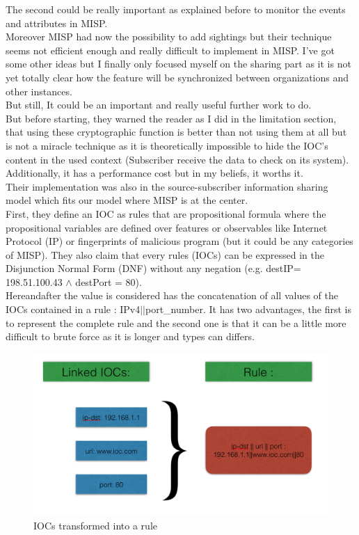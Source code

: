 \documentclass{eplmastersthesis}
\begin{document}
The second could be really important as explained before to monitor the events and attributes in MISP.\\ 
Moreover MISP had now the possibility to add sightings but their technique seems not efficient enough and really difficult to implement in MISP. I've got some other ideas but I finally only focused myself on the sharing part as it is not yet totally clear how the feature will be synchronized between organizations and other instances.\\ 
But still, It could be an important and really useful further work to do.\\

But before starting, they warned the reader as I did in the limitation section, that using these cryptographic function is better than not using them at all but is not a miracle technique as it is theoretically impossible to hide the IOC’s content in the used context (Subscriber receive the data to check on its system).\\
Additionally, it has a performance cost but in my beliefs, it worths it.\\ Their implementation was also in the source-subscriber information sharing model which fits our model where MISP is at the center.\\
First, they define an IOC as rules that are propositional formula where the propositional variables are defined over features or observables like Internet Protocol (IP) or fingerprints of malicious program (but it could be any categories of MISP). They also claim that every rules (IOCs) can be expressed in the Disjunction Normal Form (DNF) without any negation (e.g. destIP= 198.51.100.43 $\land$ destPort = 80).\\
Hereandafter the value is considered has the concatenation of all values of the IOCs contained in a rule : IPv4$||$port\_number. It has two advantages, the first is to represent the complete rule and the second one is that it can be a little more difficult to brute force as it is longer and types can differs.\\

\begin{figure}[h!]
\begin{center}
	\includegraphics[scale=0.5]{res/ioc-rules}
	\caption{IOCs transformed into a rule}
	\label{IOC-To-Rule}
\end{center}
\end{figure}
\end{document}
